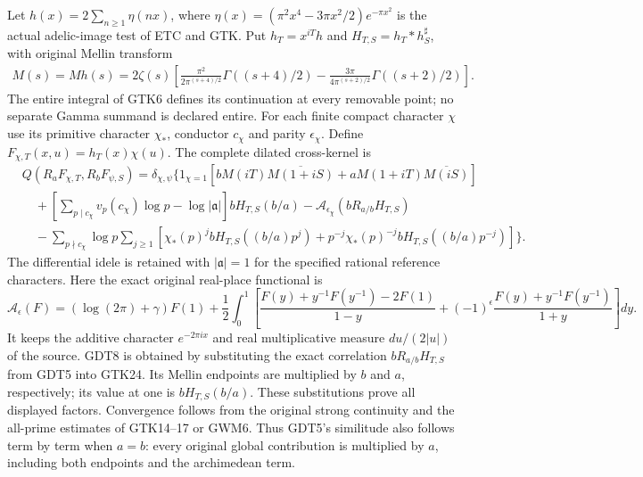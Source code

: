 Let $h(x)=2\sum_{n\ge1}\eta(nx)$, where
$\eta(x)=(\pi^2x^4-3\pi x^2/2)e^{-\pi x^2}$ is the
actual adelic-image test of ETC and GTK.
Put $h_T=x^{iT}h$ and
$H_{T,S}=h_T*h_S^\sharp$, with original Mellin transform
\begin{equation}\tag{GDT7}
 \begin{split}
 M(s)=Mh(s)=2\zeta(s)\left[
 \frac{\pi^2}{2\pi^{(s+4)/2}}\Gamma((s+4)/2)
 -\frac{3\pi}{4\pi^{(s+2)/2}}\Gamma((s+2)/2)\right].
 \end{split}
\end{equation}
The entire integral of GTK6 defines its continuation at every
removable point; no separate Gamma summand is declared entire.
For each finite compact character $\chi$ use its primitive
character $\chi_*$, conductor $c_\chi$ and parity
$\epsilon_\chi$. Define
$F_{\chi,T}(x,u)=h_T(x)\chi(u)$.
The complete dilated cross-kernel is
\begin{equation}\tag{GDT8}
 \begin{split}
 &Q(R_aF_{\chi,T},R_bF_{\psi,S})
  =\delta_{\chi,\psi}\bigg\{
 1_{\chi=1}\left[
 bM(iT)\overline{M(1+iS)}
 +aM(1+iT)\overline{M(iS)}\right]\\
 &\quad+\left[\sum_{p\mid c_\chi}v_p(c_\chi)\log p
                         -\log|\mathfrak a|\right]bH_{T,S}(b/a)
 -\mathcal A_{\epsilon_\chi}(bR_{a/b}H_{T,S})\\
 &\quad-\sum_{p\nmid c_\chi}\log p\sum_{j\ge1}
 \left[\chi_*(p)^j bH_{T,S}((b/a)p^j)
 +p^{-j}\chi_*(p)^{-j}bH_{T,S}((b/a)p^{-j})\right]\bigg\}.
 \end{split}
\end{equation}
The differential idele is retained with $|\mathfrak a|=1$
for the specified rational reference characters.
Here the exact original real-place functional is
\[
 \mathcal A_\epsilon(F)=
 (\log(2\pi)+\gamma)F(1)+\frac12\int_0^1
 \left[
 \frac{F(y)+y^{-1}F(y^{-1})-2F(1)}{1-y}
 +(-1)^\epsilon\frac{F(y)+y^{-1}F(y^{-1})}{1+y}
 \right]dy .
\]
It keeps the additive character $e^{-2\pi ix}$ and real
multiplicative measure $du/(2|u|)$ of the source.
GDT8 is obtained by substituting the exact correlation
$bR_{a/b}H_{T,S}$ from GDT5 into GTK24.
Its Mellin endpoints are multiplied by $b$ and $a$,
respectively; its value at one is $bH_{T,S}(b/a)$.
These substitutions prove all displayed factors.
Convergence follows from the original strong continuity
and the all-prime estimates of GTK14--17 or GWM6.
Thus GDT5's similitude also follows term by term when
$a=b$: every original global contribution is multiplied by
$a$, including both endpoints and the archimedean term.

